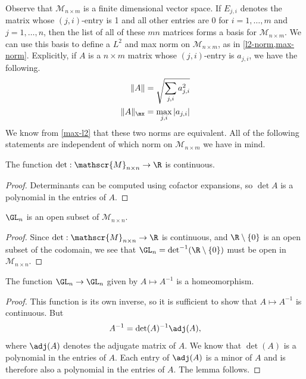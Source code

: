 Observe that $\mathscr{M}_{n \times m}$ is a finite dimensional vector space. If $E_{j,i}$ denotes the matrix whose $(j,i)$-entry is 1 and all other entries are 0 for $i = 1, \dotsc, m$ and $j = 1, \dotsc, n$, then the list of all of these $mn$ matrices forms a basis for $\mathscr{M}_{n \times m}$. We can use this basis to define a $L^2$ and max norm on $\mathscr{M}_{n \times m}$, as in \cref{l2-norm,max-norm}. Explicitly, if $A$ is a $n \times m$ matrix whose $(j,i)$-entry is $a_{j,i}$, we have the following. 
\[ \begin{aligned} \|A\| &= \sqrt{ \sum_{j,i} a_{j,i}^2 } \\
\|A\|_\mx &= \max_{j,i} |a_{j,i}| \end{aligned}  \]
We know from \cref{max-l2} that these two norms are equivalent. All of the following statements are independent of which norm on $\mathscr{M}_{n \times m}$ we have in mind. 

\begin{lemma}
	The function $\det : \mathscr{M}_{n \times n} \to \R$ is continuous.
\end{lemma}

\begin{proof}
	Determinants can be computed using cofactor expansions, so $\det A$ is a polynomial in the entries of $A$.
\end{proof}

\begin{corollary} \label{gln-open}
	$\GL_n$ is an open subset of $\mathscr{M}_{n \times n}$.
\end{corollary}

\begin{proof}
	Since $\det : \mathscr{M}_{n \times n} \to \R$ is continuous, and $\R \setminus \{0\}$ is an open subset of the codomain, we see that $\GL_n = \text{det}^{-1}(\R \setminus \{0\})$ must be open in $\mathscr{M}_{n \times n}$. 
\end{proof}

\begin{lemma} \label{inversion-homeomorphism}
	The function $\GL_n \to \GL_n$ given by $A \mapsto A^{-1}$ is a homeomorphism. 
\end{lemma}

\begin{proof}
	This function is its own inverse, so it is sufficient to show that $A \mapsto A^{-1}$ is continuous. But \[ A^{-1} = \det(A)^{-1} \adj(A), \]
	where $\adj(A)$ denotes the adjugate matrix of $A$. 
	We know that $\det(A)$ is a polynomial in the entries of $A$. Each entry of $\adj(A)$ is a minor of $A$ and is therefore also a polynomial in the entries of $A$. The lemma follows. 
\end{proof}

